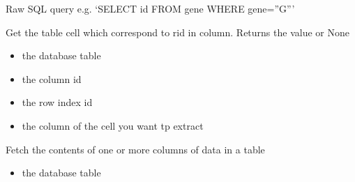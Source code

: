 \documentclass[letterpaper,10pt,english]{sphinxmanual}
\begin{document}
\begin{fulllineitems}
\begin{fulllineitems}
\begin{itemize}
\end{itemize}

\end{fulllineitems}


\begin{fulllineitems}
\label{\detokenize{modules_doc:cbmpy.CBNetDB.DBTools.fetchAll}}
\pysigstartsignatures
{}
\pysigstopsignatures
\sphinxAtStartPar
Raw SQL query e.g. ‘SELECT id FROM gene WHERE gene=”G”’

\end{fulllineitems}


\begin{fulllineitems}
\label{\detokenize{modules_doc:cbmpy.CBNetDB.DBTools.getCell}}
\pysigstartsignatures
{}
\pysigstopsignatures
\sphinxAtStartPar
Get the table cell which correspond to rid in column. Returns the value or None
\begin{itemize}
\item {} 
\sphinxAtStartPar
{} the database table

\item {} 
\sphinxAtStartPar
{} the column id

\item {} 
\sphinxAtStartPar
{} the row index id

\item {} 
\sphinxAtStartPar
{} the column of the cell you want tp extract

\end{itemize}

\end{fulllineitems}


\begin{fulllineitems}
\label{\detokenize{modules_doc:cbmpy.CBNetDB.DBTools.getColumns}}
\pysigstartsignatures
{}
\pysigstopsignatures
\sphinxAtStartPar
Fetch the contents of one or more columns of data in a table
\begin{itemize}
\item {} 
\sphinxAtStartPar
{} the database table


\end{itemize}
\end{fulllineitems}
\end{fulllineitems}
\end{document}
